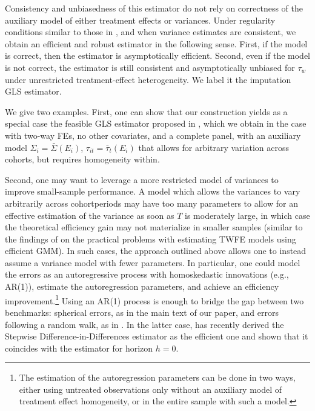 \documentclass[english,11pt]{article}
\theoremstyle{plain}
\theoremstyle{plain}
\theoremstyle{plain}
\theoremstyle{plain}
\let\ref\Cref
\begin{document}
Consistency and unbiasedness of this estimator do not rely on correctness
of the auxiliary model of either treatment effects or variances. Under
regularity conditions similar to those in \ref{prop:asymptoticnormality,prop:normality-sufficient},
and when variance estimates are consistent, we obtain an efficient
and robust estimator in the following sense. First, if the model is
correct, then the estimator is asymptotically efficient. Second, even
if the model is not correct, the estimator is still consistent and
asymptotically unbiased for $\tau_{w}$ under unrestricted treatment-effect
heterogeneity. We label it the imputation GLS estimator.

We give two examples. First, one can show that our construction yields
as a special case the feasible GLS estimator proposed in \textcite{Wooldridge2021},
which we obtain in the case with two-way FEs, no other covariates,
and a complete panel, with an auxiliary model $\Sigma_{i}=\bar{\Sigma}(E_{i})$,
$\tau_{it}=\bar{\tau}_{t}(E_{i})$ that allows for arbitrary variation
across cohorts, but requires homogeneity within.

Second, one may want to leverage a more restricted model of variances
to improve small-sample performance. A model which allows the variances
to vary arbitrarily across cohort\textendash periods may have too
many parameters to allow for an effective estimation of the variance
as soon as $T$ is moderately large, in which case the theoretical
efficiency gain may not materialize in smaller samples (similar to
the findings of \textcite{Marcus2020} on the practical problems with
estimating TWFE models using efficient GMM). In such cases, the approach
outlined above allows one to instead assume a variance model with
fewer parameters. In particular, one could model the errors as an
autoregressive process with homoskedastic innovations (e.g., AR(1)),
estimate the autoregression parameters, and achieve an efficiency
improvement.\footnote{The estimation of the autoregression parameters can be done in two
ways, either using untreated observations only without an auxiliary
model of treatment effect homogeneity, or in the entire sample with
such a model.} Using an AR(1) process is enough to bridge the gap between two benchmarks:
spherical errors, as in the main text of our paper, and errors following
a random walk, as in \textcite{harmon_DiD}. In the latter case, \textcite{harmon_DiD}
has recently derived the Stepwise Difference-in-Differences estimator
as the efficient one and shown that it coincides with the \textcite{DeChaisemartin2018}
estimator for horizon $h=0$.
\end{document}
